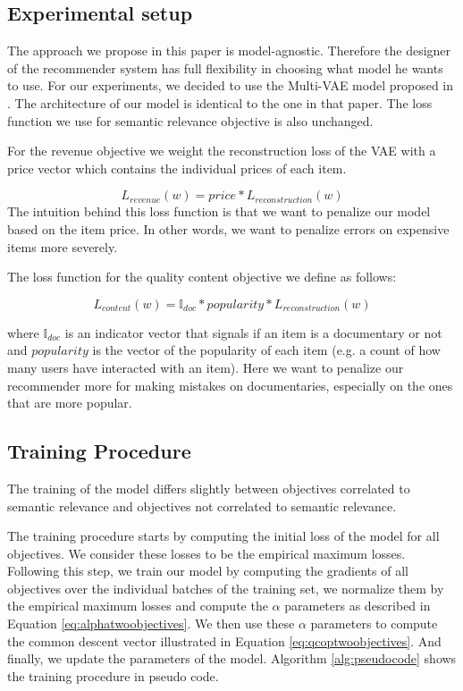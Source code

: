 \documentclass[letterpaper]{article}
\begin{document}
\subsection{Experimental setup}

The approach we propose in this paper is model-agnostic. Therefore the designer of the recommender system has full flexibility in choosing what model he wants to use. For our experiments, we decided to use the Multi-VAE model proposed in \cite{liang2018variational}. The architecture of our model is identical to the one in that paper. The loss function we use for semantic relevance objective is also unchanged.

For the revenue objective we weight the reconstruction loss of the VAE with a price vector which contains the individual prices of each item.

\begin{equation}
\label{eq:revenueloss}
    L_{revenue}(w) = price*L_{reconstruction}(w)
\end{equation}
The intuition behind this loss function is that we want to penalize our model based on the item price. In other words, we want to penalize errors on expensive items more severely.

The loss function for the quality content objective we define as follows:

\begin{equation}
\label{eq:documentaryloss}
    L_{content}(w) = \mathbb{I}_{doc}*popularity*L_{reconstruction}(w)
\end{equation}

where $\mathbb{I}_{doc}$ is an indicator vector that signals if an item is a documentary or not and $popularity$ is the vector of the popularity of each item (e.g. a count of how many users have interacted with an item). Here we want to penalize our recommender more for making mistakes on documentaries, especially on the ones that are more popular.

\subsection{Training Procedure}

The training of the model differs slightly between objectives correlated to semantic relevance and objectives not correlated to semantic relevance. 

The training procedure starts by computing the initial loss of the model for all objectives. We consider these losses to be the empirical maximum losses. Following this step, we train our model by computing the gradients of all objectives over the individual batches of the training set, we normalize them by the empirical maximum losses and compute the $\alpha$ parameters as described in Equation \ref{eq:alphatwoobjectives}. We then use these $\alpha$ parameters to compute the common descent vector illustrated in Equation \ref{eq:qcoptwoobjectives}. And finally, we update the parameters of the model. Algorithm \ref{alg:pseudocode} shows the training procedure in pseudo code.
\end{document}
